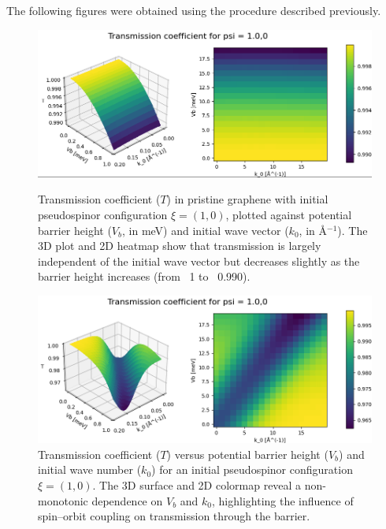 The following figures were obtained using the procedure described previously.

\begin{figure}[h!]
    \centering
    \begin{minipage}[t]{0.48\textwidth}
        \centering
        \includegraphics[width=\textwidth]{../assets/images/No-Rashba/TCoefficient(1.0,0)xalpha=0beta=0}
        \caption{Transmission coefficient ($T$) in pristine graphene with initial pseudospinor configuration $\xi = (1, 0)$, plotted against potential barrier height ($V_b$, in meV) and initial wave vector ($k_0$, in \AA$^{-1}$). The 3D plot and 2D heatmap show that transmission is largely independent of the initial wave vector but decreases slightly as the barrier height increases (from ~1 to ~0.990).}
        \label{fig:noRashba}
    \end{minipage}
    \hfill
    \begin{minipage}[t]{0.48\textwidth}
        \centering
        \includegraphics[width=\textwidth]{../assets/images/Rashba/TCoefficient(1.0,0)xalpha=0.2beta=-0.2}
        \caption{Transmission coefficient ($T$) versus potential barrier height ($V_b$) and initial wave number ($k_0$) for an initial pseudospinor configuration $\xi = (1, 0)$. The 3D surface and 2D colormap reveal a non-monotonic dependence on $V_b$ and $k_0$, highlighting the influence of spin–orbit coupling on transmission through the barrier.}
        \label{fig:rashba}
    \end{minipage}
\end{figure}

